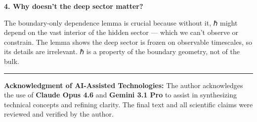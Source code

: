 \documentclass[
]{article}
\begin{document}
\textbf{4. Why doesn't the deep sector matter?}

The boundary-only dependence lemma is crucial because without it, ℏ
might depend on the vast interior of the hidden sector --- which we
can't observe or constrain. The lemma shows the deep sector is frozen on
observable timescales, so its details are irrelevant. ℏ is a property of
the boundary geometry, not of the bulk.

\begin{center}\rule{0.5\linewidth}{0.5pt}\end{center}

\textbf{Acknowledgment of AI-Assisted Technologies:} The author
acknowledges the use of \textbf{Claude Opus 4.6} and \textbf{Gemini 3.1
Pro} to assist in synthesizing technical concepts and refining clarity.
The final text and all scientific claims were reviewed and verified by
the author.
\end{document}
